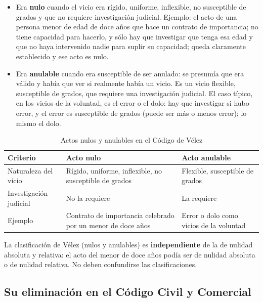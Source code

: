 \documentclass[12pt,oneside]{book}
\begin{document}
\begin{itemize}
    \item Era \textbf{nulo} cuando el vicio era rígido, uniforme, inflexible, no susceptible de grados y que no requiere investigación judicial. Ejemplo: el acto de una persona menor de edad de doce años que hace un contrato de importancia; no tiene capacidad para hacerlo, y sólo hay que investigar que tenga esa edad y que no haya intervenido nadie para suplir su capacidad; queda claramente establecido y ese acto es nulo.
    \item Era \textbf{anulable} cuando era susceptible de ser anulado: se presumía que era válido y había que ver si realmente había un vicio. Es un vicio flexible, susceptible de grados, que requiere una investigación judicial. El caso típico, en los vicios de la voluntad, es el error o el dolo: hay que investigar si hubo error, y el error es susceptible de grados (puede ser más o menos error); lo mismo el dolo.
\end{itemize}

\begin{table}[H]
\centering
\caption{Actos nulos y anulables en el Código de Vélez}
\begin{tabularx}{\textwidth}{
    >{\raggedright\arraybackslash}p{}
    >{\raggedright\arraybackslash}X
    >{\raggedright\arraybackslash}X
}
\toprule
\textbf{Criterio} & \textbf{Acto nulo} & \textbf{Acto anulable} \\
\midrule
Naturaleza del vicio & Rígido, uniforme, inflexible, no susceptible de grados & Flexible, susceptible de grados \\
\addlinespace
Investigación judicial & No la requiere & La requiere \\
\addlinespace
Ejemplo & Contrato de importancia celebrado por un menor de doce años & Error o dolo como vicios de la voluntad \\
\bottomrule
\end{tabularx}
\end{table}

\begin{important}
La clasificación de Vélez (nulos y anulables) es \textbf{independiente} de la de nulidad absoluta y relativa: el acto del menor de doce años podía ser de nulidad absoluta o de nulidad relativa. No deben confundirse las clasificaciones.
\end{important}

\subsection*{Su eliminación en el Código Civil y Comercial}
\end{document}
